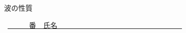 \documentclass[a4paper,9pt]{jsarticle}
\begin{document}
\hakosyokika
\begin{center}
{\Large 波の性質}
\end{center}
\hfill ~\underline{~~~~~~番　氏名~~~~~~~~~~~~~~~~~~~~~~~~~~~~~~~~~~~}
\hakosyokika

\begin{enumerate}

    
\newpage
    
\newpage
    
\newpage
    
\vfill
\vfill
\vfill
    
\vfill

\vfill
\end{enumerate}
\end{document}
